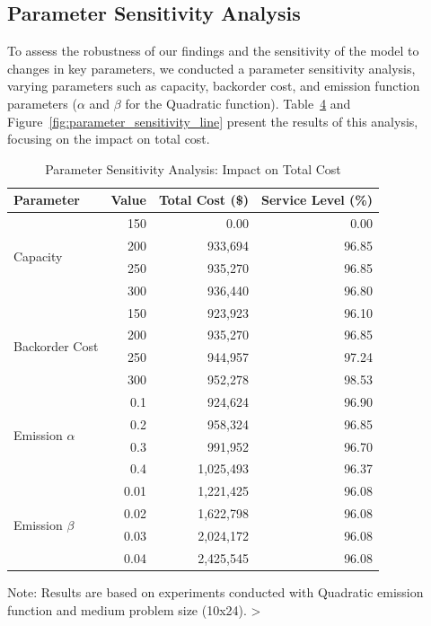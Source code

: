 \begin{table}[htbp]
\begin{table}[htbp]
\begin{table}[htbp]
\subsection{Parameter Sensitivity Analysis}
\label{subsec:parameter_sensitivity}
To assess the robustness of our findings and the sensitivity of the model to changes in key parameters, we conducted a parameter sensitivity analysis, varying parameters such as capacity, backorder cost, and emission function parameters ($\alpha$ and $\beta$ for the Quadratic function). Table~\ref{tab:parameter_sensitivity} and Figure~\ref{fig:parameter_sensitivity_line} present the results of this analysis, focusing on the impact on total cost.

\begin{table}[htbp]
    \centering
    \caption{Parameter Sensitivity Analysis: Impact on Total Cost}
    \label{tab:parameter_sensitivity}
    \begin{tabular}{lrrr}
        \toprule
        Parameter & Value & Total Cost (\$) & Service Level (\%) \\
        \midrule
        \multirow{4}{*}{Capacity} & 150 & 0.00 & 0.00 \\
         & 200 & 933,694 & 96.85 \\
         & 250 & 935,270 & 96.85 \\
         & 300 & 936,440 & 96.80 \\
        \midrule
        \multirow{4}{*}{Backorder Cost} & 150 & 923,923 & 96.10 \\
         & 200 & 935,270 & 96.85 \\
         & 250 & 944,957 & 97.24 \\
         & 300 & 952,278 & 98.53 \\
        \midrule
        \multirow{4}{*}{Emission $\alpha$} & 0.1 & 924,624 & 96.90 \\
         & 0.2 & 958,324 & 96.85 \\
         & 0.3 & 991,952 & 96.70 \\
         & 0.4 & 1,025,493 & 96.37 \\
        \midrule
        \multirow{4}{*}{Emission $\beta$} & 0.01 & 1,221,425 & 96.08 \\
         & 0.02 & 1,622,798 & 96.08 \\
         & 0.03 & 2,024,172 & 96.08 \\
         & 0.04 & 2,425,545 & 96.08 \\
        \bottomrule
    \end{tabular}
    \footnotesize{Note: Results are based on experiments conducted with Quadratic emission function and medium problem size (10x24).}
\table>


\end{table}
\end{table}
\end{table}
\end{table}
